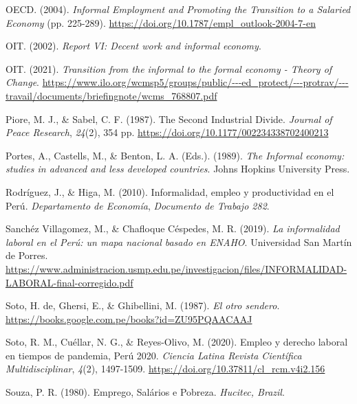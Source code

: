 \documentclass[
  letterpaper,
  12pt,
  oneside,
  spanish,
  doublespacing,
  headsepline,
  parskip]{MastersDoctoralThesis}
\newlength{\cslhangindent}
\newlength{\cslentryspacingunit} %
\newenvironment{CSLReferences}[2] %
 {%
  \setlength{\parindent}{0pt}
  \ifodd #1
  \let\oldpar\par
  \def\par{\hangindent=\cslhangindent\oldpar}
  \fi
  \setlength{\parskip}{#2\cslentryspacingunit}
 }%
 {}
\begin{document}
\begin{CSLReferences}{1}{0}
\leavevmode{}%
OECD. (2004). \emph{Informal Employment and Promoting the Transition to
a Salaried Economy} (pp. 225-289).
\url{https://doi.org/10.1787/empl_outlook-2004-7-en}

\leavevmode{}%
OIT. (2002). \emph{Report VI: Decent work and informal economy}.

\leavevmode{}%
OIT. (2021). \emph{Transition from the informal to the formal economy -
Theory of Change}.
\url{https://www.ilo.org/wcmsp5/groups/public/---ed_protect/---protrav/---travail/documents/briefingnote/wcms_768807.pdf}

\leavevmode{}%
Piore, M. J., \& Sabel, C. F. (1987). The Second Industrial Divide.
\emph{Journal of Peace Research}, \emph{24}(2), 354 pp.
\url{https://doi.org/10.1177/002234338702400213}

\leavevmode{}%
Portes, A., Castells, M., \& Benton, L. A. (Eds.). (1989). \emph{The
Informal economy: studies in advanced and less developed countries}.
Johns Hopkins University Press.

\leavevmode{}%
Rodríguez, J., \& Higa, M. (2010). Informalidad, empleo y productividad
en el Perú. \emph{Departamento de Economía}, \emph{Documento de Trabajo
282}.

\leavevmode{}%
Sanchéz Villagomez, M., \& Chafloque Céspedes, M. R. (2019). \emph{La
informalidad laboral en el Perú: un mapa nacional basado en ENAHO}.
Universidad San Martín de Porres.
\url{https://www.administracion.usmp.edu.pe/investigacion/files/INFORMALIDAD-LABORAL-final-corregido.pdf}

\leavevmode{}%
Soto, H. de, Ghersi, E., \& Ghibellini, M. (1987). \emph{El otro
sendero}. \url{https://books.google.com.pe/books?id=ZU95PQAACAAJ}

\leavevmode{}%
Soto, R. M., Cuéllar, N. G., \& Reyes-Olivo, M. (2020). Empleo y derecho
laboral en tiempos de pandemia, Perú 2020. \emph{Ciencia Latina Revista
Científica Multidisciplinar}, \emph{4}(2), 1497-1509.
\url{https://doi.org/10.37811/cl_rcm.v4i2.156}

\leavevmode{}%
Souza, P. R. (1980). Emprego, Salários e Pobreza. \emph{Hucitec,
Brazil}.


\end{CSLReferences}
\end{document}
